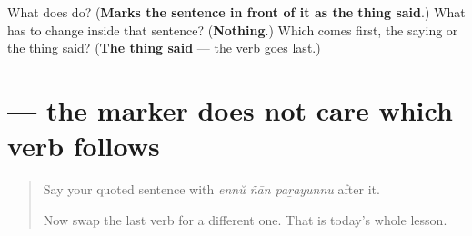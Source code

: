 \begin{tcolorbox}[breakable,colback=teal!4,colframe=teal!35!black,title={Before you move on}]
What does \textbf{} do? (\textbf{Marks the sentence in front of it as the thing said}.) What has to change inside that sentence? (\textbf{Nothing}.) Which comes first, the saying or the thing said? (\textbf{The thing said} — the verb goes last.)
\end{tcolorbox}
\section[\texorpdfstring{\ml{എന്ന്} \ml{ചിന്തിക്കുന്നു} (ennŭ cintikkunnu)}{എന്ന് ചിന്തിക്കുന്നു (ennŭ cintikkunnu)}]{  — the marker does not care which verb follows}

\label{lesson:ML-C72-ennu-more}



\begin{quote}
Say your quoted sentence with \emph{ennŭ ñān paṟayunnu} after it.

Now swap the last verb for a different one. That is today's whole lesson.
\end{quote}

